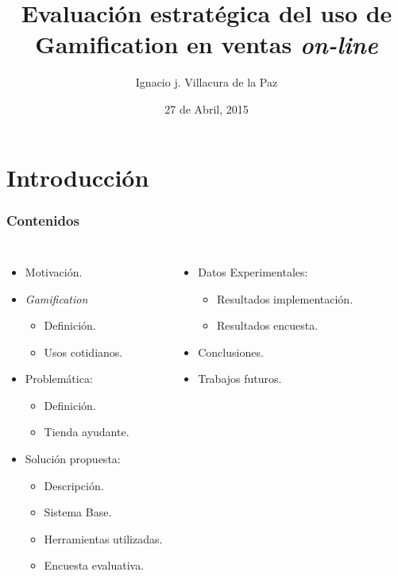 \documentclass[10pt, compress]{beamer}
\title{Evaluación estratégica del uso de Gamification en ventas \emph{on-line}}
\subtitle{}
\date{27 de Abril, 2015}
\author{Ignacio j. Villacura de la Paz}
\institute{Departamento de Informática\\ Universidad Técnica Federico Santa María}
\begin{document}
\maketitle

\section{Introducción}

\begin{frame}[fragile]
  \frametitle{Contenidos}

\begin{columns}[onlytextwidth]
  \begin{itemize}
    \item Motivación.
    \item \emph{Gamification}
	\begin{itemize}
	  \item Definición.
	  \item Usos cotidianos.
	\end{itemize}
    \item Problemática:
	\begin{itemize}
          \item Definición.
          \item Tienda ayudante.
        \end{itemize}
    \item Solución propuesta:
	\begin{itemize}
          \item Descripción.
          \item Sistema Base.
	  \item Herramientas utilizadas.
	  \item Encuesta evaluativa.
        \end{itemize}
\end{itemize}

  \begin{itemize}
    \item Datos Experimentales:
	\begin{itemize}
          \item Resultados implementación.
          \item Resultados encuesta.
        \end{itemize}
    \item Conclusiones.
    \item Trabajos futuros.
  \end{itemize}
\end{columns}
\end{frame}
\end{document}
